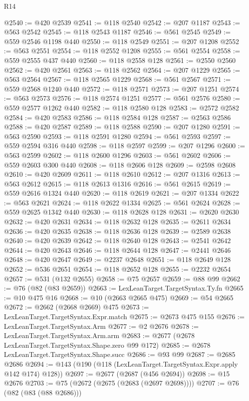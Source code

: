 \begin{lexlean}{R14}
\begin{coremodule}
{{{{{{{{{{{{{{{{{{{{{{{{{{{{{{{{{{{{{{{{{{{{{{{{{{{{{{{{{{{{{{{{{{{{{{{{{{{{{{{{{{@2540 := @420 @2539
@2541 := @118 @2540
@2542 := @207 @1187
@2543 := @563 @2542
@2545 := @118 @2543 @1187
@2546 := @561 @2545
@2549 := @559 @2546 @1198 @440
@2550 := @118 @2549
@2551 := @207 @1208
@2552 := @563 @2551
@2554 := @118 @2552 @1208
@2555 := @561 @2554
@2558 := @559 @2555 @437 @440
@2560 := @118 @2558 @128
@2561 := @2550 @2560
@2562 := @420 @2561
@2563 := @118 @2562
@2564 := @207 @1229
@2565 := @563 @2564
@2567 := @118 @2565 @1229
@2568 := @561 @2567
@2571 := @559 @2568 @1240 @440
@2572 := @118 @2571
@2573 := @207 @1251
@2574 := @563 @2573
@2576 := @118 @2574 @1251
@2577 := @561 @2576
@2580 := @559 @2577 @1262 @440
@2582 := @118 @2580 @128
@2583 := @2572 @2582
@2584 := @420 @2583
@2586 := @118 @2584 @128
@2587 := @2563 @2586
@2588 := @420 @2587
@2589 := @118 @2588
@2590 := @207 @1280
@2591 := @563 @2590
@2593 := @118 @2591 @1280
@2594 := @561 @2593
@2597 := @559 @2594 @316 @440
@2598 := @118 @2597
@2599 := @207 @1296
@2600 := @563 @2599
@2602 := @118 @2600 @1296
@2603 := @561 @2602
@2606 := @559 @2603 @300 @440
@2608 := @118 @2606 @128
@2609 := @2598 @2608
@2610 := @420 @2609
@2611 := @118 @2610
@2612 := @207 @1316
@2613 := @563 @2612
@2615 := @118 @2613 @1316
@2616 := @561 @2615
@2619 := @559 @2616 @1324 @440
@2620 := @118 @2619
@2621 := @207 @1334
@2622 := @563 @2621
@2624 := @118 @2622 @1334
@2625 := @561 @2624
@2628 := @559 @2625 @1342 @440
@2630 := @118 @2628 @128
@2631 := @2620 @2630
@2632 := @420 @2631
@2634 := @118 @2632 @128
@2635 := @2611 @2634
@2636 := @420 @2635
@2638 := @118 @2636 @128
@2639 := @2589 @2638
@2640 := @420 @2639
@2642 := @118 @2640 @128
@2643 := @2541 @2642
@2644 := @420 @2643
@2646 := @118 @2644 @128
@2647 := @2441 @2646
@2648 := @420 @2647
@2649 := @2237 @2648
@2651 := @118 @2649 @128
@2652 := @536 @2651
@2654 := @118 @2652 @128
@2655 := @2232 @2654
@2657 := @531 (@132 @2655)
@2658 := @75 @2657
@2659 := @88 @99
@2662 := @76 (@82 (@83 @2659))
@2663 := LexLeanTarget.TargetSyntax.Ty.fn
@2665 := @10 @475 @16
@2668 := @10 (@2663 @2665 @475)
@2669 := @54 @2665
@2672 := @2662 (@2668 @2669) @475
@2673 := LexLeanTarget.TargetSyntax.Expr.match
@2675 := @2673 @475 @155
@2676 := LexLeanTarget.TargetSyntax.Arm
@2677 := @2 @2676
@2678 := LexLeanTarget.TargetSyntax.Arm.arm
@2683 := @2677 (@2678 LexLeanTarget.TargetSyntax.Shape.zero @99 @172)
@2685 := @2678 LexLeanTarget.TargetSyntax.Shape.succ
@2686 := @93 @99
@2687 := @2685 @2686
@2694 := @143 (@190 (@118 (LexLeanTarget.TargetSyntax.Expr.apply @142 @174) @128))
@2697 := @2677 (@2687 (@456 @2694))
@2698 := @15 @2676
@2703 := @75 (@2672 (@2675 (@2683 (@2697 @2698))))
@2707 := @76 (@82 (@83 (@88 @2686)))
}}}}}}}}}}}}}}}}}}}}}}}}}}}}}}}}}}}}}}}}}}}}}}}}}}}}}}}}}}}}}}}}}}}}}}}}}}}}}}}}}}
\end{coremodule}
\end{lexlean}
